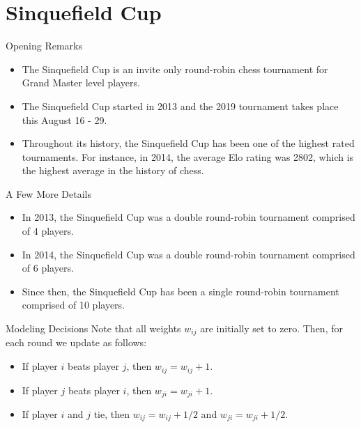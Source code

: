 \documentclass{beamer}
\begin{document}
\section{Sinquefield Cup}

\begin{frame}{Opening Remarks}
\begin{itemize}
\item	The Sinquefield Cup is an invite only round-robin chess tournament for Grand Master level players.
\vfill
\item	The Sinquefield Cup started in 2013 and the 2019 tournament takes place this August 16 - 29.
\vfill
\item	Throughout its history, the Sinquefield Cup has been one of the highest rated tournaments.
	For instance, in 2014, the average Elo rating was 2802, which is the highest average in the history of chess. 
\end{itemize}
\end{frame}

\begin{frame}{A Few More Details}
\begin{itemize}
\item	In 2013, the Sinquefield Cup was a double round-robin tournament comprised of 4 players.
\vfill
\item	In 2014, the Sinquefield Cup was a double round-robin tournament comprised of 6 players.
\vfill
\item	Since then, the Sinquefield Cup has been a single round-robin tournament comprised of 10 players. 
\end{itemize}
\end{frame}

\begin{frame}{Modeling Decisions}
Note that all weights $w_{ij}$ are initially set to zero.
Then, for each round we update as follows:
\vfill
\begin{itemize}
\item	If player $i$ beats player $j$, then $w_{ij}=w_{ij}+1$.
\vfill
\item	If player $j$ beats player $i$, then $w_{ji}=w_{ji}+1$.
\vfill
\item	If player $i$ and $j$ tie, then $w_{ij}=w_{ij}+1/2$ and $w_{ji}=w_{ji}+1/2$. 
\end{itemize}
\end{frame}
\end{document}
